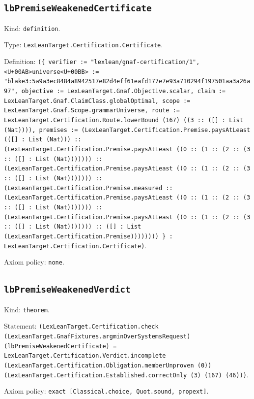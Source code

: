 \documentclass[11pt]{article}
\begin{document}
\subsection*{\texttt{lbPremiseWeakenedCertificate}}
\noindent Kind: \texttt{definition}.\par
\noindent Type: \texttt{LexLeanTarget.Certification.Certificate}.\par
\noindent Definition: \texttt{(\{ verifier := "lexlean/gnaf-certification/1", <U+00AB>universe<U+00BB> := "blake3:5a9a3ec8484a8942517e82d4eff61eafd177e7e93a710294f197501aa3a26a97", objective := LexLeanTarget.Gnaf.Objective.scalar, claim := LexLeanTarget.Gnaf.ClaimClass.globalOptimal, scope := LexLeanTarget.Gnaf.Scope.grammarUniverse, route := LexLeanTarget.Certification.Route.lowerBound (167) ((3 :: ([] : List (Nat)))), premises := (LexLeanTarget.Certification.Premise.paysAtLeast (([] : List (Nat))) :: (LexLeanTarget.Certification.Premise.paysAtLeast ((0 :: (1 :: (2 :: (3 :: ([] : List (Nat))))))) :: (LexLeanTarget.Certification.Premise.paysAtLeast ((0 :: (1 :: (2 :: (3 :: ([] : List (Nat))))))) :: (LexLeanTarget.Certification.Premise.measured :: (LexLeanTarget.Certification.Premise.paysAtLeast ((0 :: (1 :: (2 :: (3 :: ([] : List (Nat))))))) :: (LexLeanTarget.Certification.Premise.paysAtLeast ((0 :: (1 :: (2 :: (3 :: ([] : List (Nat))))))) :: ([] : List (LexLeanTarget.Certification.Premise)))))))) \} : LexLeanTarget.Certification.Certificate)}.\par
\noindent Axiom policy: \texttt{none}.\par
\subsection*{\texttt{lbPremiseWeakenedVerdict}}
\noindent Kind: \texttt{theorem}.\par
\noindent Statement: \texttt{(LexLeanTarget.Certification.check (LexLeanTarget.GnafFixtures.argminOverSystemsRequest) (lbPremiseWeakenedCertificate) = LexLeanTarget.Certification.Verdict.incomplete (LexLeanTarget.Certification.Obligation.memberUnproven (0)) (LexLeanTarget.Certification.Established.correctOnly (3) (167) (46)))}.\par
\noindent Axiom policy: \texttt{exact [Classical.choice, Quot.sound, propext]}.\par
\end{document}
